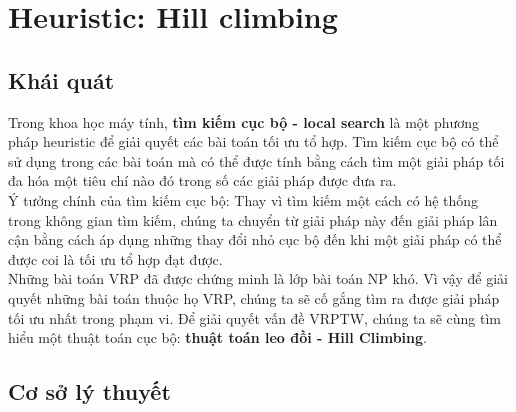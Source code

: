 \documentclass[12pt,a4paper]{article}\author{Nguyễn Nho Dũng}
\let\svsection\section
\def\section{\setcounter{figure}{0}\svsection}
\newcommand{\kniem}[1]{{\sffamily\bfseries #1}}
\begin{document}
\newpage\section{Heuristic: Hill climbing}
\subsection{Khái quát}
Trong khoa học máy tính, \kniem{tìm kiếm cục bộ - local search} là một phương pháp heuristic để giải quyết các bài toán tối ưu tổ hợp. Tìm kiếm cục bộ có thể sử dụng trong các bài toán mà có thể được tính bằng cách tìm một giải pháp tối đa hóa một tiêu chí nào đó trong số các giải pháp được đưa ra. \\[5pt]
Ý tưởng chính của tìm kiếm cục bộ: Thay vì tìm kiếm một cách có hệ thống trong không gian tìm kiếm, chúng ta chuyển từ giải pháp này đến giải pháp lân cận bằng cách áp dụng những thay đổi nhỏ cục bộ đến khi một giải pháp có thể được coi là tối ưu tổ hợp đạt được. \\
Những bài toán VRP đã được chứng minh là lớp bài toán NP khó. Vì vậy để giải quyết những bài toán thuộc họ VRP, chúng ta sẽ cố gắng tìm ra được giải pháp tối ưu nhất trong phạm vi. Để giải quyết vấn đề VRPTW, chúng ta sẽ cùng tìm hiểu một thuật toán cục bộ: \kniem{thuật toán leo đồi - Hill Climbing}.
\subsection{Cơ sở lý thuyết}
\end{document}
